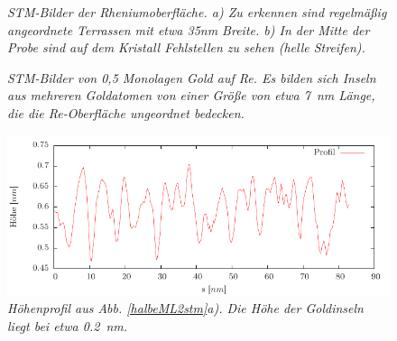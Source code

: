 \begin{figure}[htbp]
	\begin{minipage}[b]{0.5\textwidth} 
		\sffamily
		
	\end{minipage}
	\hfill
	\begin{minipage}[b]{0.5\textwidth}
		\sffamily
		
	\end{minipage}
	\caption{\textit{STM-Bilder der Rheniumoberfläche. a) Zu erkennen sind regelmäßig angeordnete
	Terrassen mit etwa 35nm Breite. b) In der Mitte der Probe sind auf dem Kristall Fehlstellen zu
	sehen (helle Streifen).}}
	\label{rekristallstm} 
	\begin{minipage}[b]{0.5\textwidth} 
		\sffamily
		
	\end{minipage}
	\hfill
	\begin{minipage}[b]{0.5\textwidth}
		\sffamily
		
	\end{minipage}
	\caption{\textit{STM-Bilder von 0,5 Monolagen Gold auf Re. Es bilden sich Inseln aus
	mehreren Goldatomen von einer Größe von etwa \SI{7}{nm} Länge, die die Re-Oberfläche ungeordnet bedecken.}}
	\label{halbeML2stm} 
	\vfill
	\centering
	\includegraphics{pics/profilhalbeML}
	\caption{\textit{Höhenprofil aus Abb. \ref{halbeML2stm}a). Die Höhe der Goldinseln liegt bei etwa
	\SI{0,2}{nm}.}}
	\label{profilhalbeML} 
\end{figure}


\FloatBarrier

